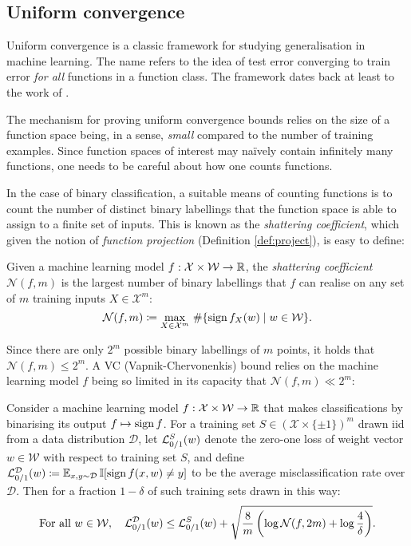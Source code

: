 \begin{refsection}
\section{Uniform convergence}

Uniform convergence is a classic framework for studying generalisation in machine learning. The name refers to the idea of test error converging to train error \textit{for all} functions in a function class. The framework dates back at least to the work of \citet{vcpaper}.

The mechanism for proving uniform convergence bounds relies on the size of a function space being, in a sense, \textit{small} compared to the number of training examples. Since function spaces of interest may naïvely contain infinitely many functions, one needs to be careful about how one counts functions.

In the case of binary classification, a suitable means of counting functions is to count the number of distinct binary labellings that the function space is able to assign to a finite set of inputs. This is known as the \textit{shattering coefficient}, which given the notion of \textit{function projection} (Definition \ref{def:project}), is easy to define:

\begin{definition} Given a machine learning model $f:\mathcal{X}\times \mathcal{W}\to\mathbb{R}$, the \textit{shattering coefficient} $\mathcal{N}(f,m)$ is the largest number of binary labellings that $f$ can realise on any set of $m$ training inputs $X\in\mathcal{X}^m$:
\begin{equation}
    \mathcal{N}(f,m) \coloneqq \max_{X\in\mathcal{X}^m} \,\# \{\operatorname{sign} f_X(w) \mid w\in\mathcal{W}\}.
\end{equation}
\end{definition}

Since there are only $2^m$ possible binary labellings of $m$ points, it holds that $\mathcal{N}(f,m) \leq 2^m$. A VC (Vapnik-Chervonenkis) bound relies on the machine learning model $f$ being so limited in its capacity that $\mathcal{N}(f,m) \ll 2^m$:

\begin{theorem}[VC bound]\label{thm:vc} Consider a machine learning model $f:\mathcal{X}\times \mathcal{W}\to\mathbb{R}$ that makes classifications by binarising its output $f \mapsto \operatorname{sign} f$. For a training set $S \in (\mathcal{X} \times \{\pm1\})^m$ drawn iid from a data distribution $\mathcal{D}$, let $\mathcal{L}_{0/1}^S(w)$ denote the zero-one loss of weight vector $w\in\mathcal{W}$ with respect to training set $S$, and define $\mathcal{L}_{0/1}^\mathcal{D}(w)\coloneqq \operatorname{\mathbb{E}}_{x,y\sim\mathcal{D}}\mathbb{I}[\operatorname{sign} f(x,w) \neq y]$ to be the average misclassification rate over $\mathcal{D}$. Then for a fraction $1-\delta$ of such training sets drawn in this way:
\begin{equation}
\text{For all } w\in\mathcal{W},\quad
    \mathcal{L}_{0/1}^\mathcal{D}(w) \leq \mathcal{L}_{0/1}^S(w) + \sqrt{\frac{8}{m}\left(\log  \mathcal{N}(f,2m)+\log \frac{4}{\delta}\right)}.
\end{equation}
\end{theorem}


\end{refsection}
